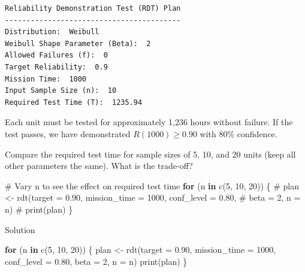 \documentclass[
  letterpaper,
  DIV=11,
  numbers=noendperiod]{scrreprt}
\newenvironment{Shaded}{\begin{snugshade}}{\end{snugshade}}
\newcommand{\AttributeTok}[1]{\textcolor[rgb]{0.40,0.45,0.13}{#1}}
\newcommand{\CommentTok}[1]{\textcolor[rgb]{0.37,0.37,0.37}{#1}}
\newcommand{\ControlFlowTok}[1]{\textcolor[rgb]{0.00,0.23,0.31}{\textbf{#1}}}
\newcommand{\DecValTok}[1]{\textcolor[rgb]{0.68,0.00,0.00}{#1}}
\newcommand{\FloatTok}[1]{\textcolor[rgb]{0.68,0.00,0.00}{#1}}
\newcommand{\FunctionTok}[1]{\textcolor[rgb]{0.28,0.35,0.67}{#1}}
\newcommand{\NormalTok}[1]{\textcolor[rgb]{0.00,0.23,0.31}{#1}}
\newcommand{\OtherTok}[1]{\textcolor[rgb]{0.00,0.23,0.31}{#1}}
\begin{document}
\begin{verbatim}
Reliability Demonstration Test (RDT) Plan
-----------------------------------------
Distribution:  Weibull 
Weibull Shape Parameter (Beta):  2 
Allowed Failures (f):  0 
Target Reliability:  0.9 
Mission Time:  1000 
Input Sample Size (n):  10 
Required Test Time (T):  1235.94 
\end{verbatim}

Each unit must be tested for approximately 1,236 hours without failure.
If the test passes, we have demonstrated \(R(1000) \geq 0.90\) with 80\%
confidence.

\begin{tcolorbox}[enhanced jigsaw, arc=.35mm, bottomrule=.15mm, bottomtitle=1mm, breakable, colback=white, colbacktitle=quarto-callout-note-color!10!white, colframe=quarto-callout-note-color-frame, coltitle=black, left=2mm, leftrule=.75mm, opacityback=0, opacitybacktitle=0.6, rightrule=.15mm, title=\textcolor{quarto-callout-note-color}{\faInfo}\hspace{0.5em}{Try It}, titlerule=0mm, toprule=.15mm, toptitle=1mm]

Compare the required test time for sample sizes of 5, 10, and 20 units
(keep all other parameters the same). What is the trade-off?

\begin{Shaded}
\begin{Highlighting}[]
\CommentTok{\# Vary n to see the effect on required test time}
\ControlFlowTok{for}\NormalTok{ (n }\ControlFlowTok{in} \FunctionTok{c}\NormalTok{(}\DecValTok{5}\NormalTok{, }\DecValTok{10}\NormalTok{, }\DecValTok{20}\NormalTok{)) \{}
  \CommentTok{\# plan \textless{}{-} rdt(target = 0.90, mission\_time = 1000, conf\_level = 0.80,}
  \CommentTok{\#             beta = 2, n = n)}
  \CommentTok{\# print(plan)}
\NormalTok{\}}
\end{Highlighting}
\end{Shaded}

Solution

\begin{Shaded}
\begin{Highlighting}[]
\ControlFlowTok{for}\NormalTok{ (n }\ControlFlowTok{in} \FunctionTok{c}\NormalTok{(}\DecValTok{5}\NormalTok{, }\DecValTok{10}\NormalTok{, }\DecValTok{20}\NormalTok{)) \{}
\NormalTok{  plan }\OtherTok{\textless{}{-}} \FunctionTok{rdt}\NormalTok{(}\AttributeTok{target =} \FloatTok{0.90}\NormalTok{, }\AttributeTok{mission\_time =} \DecValTok{1000}\NormalTok{, }\AttributeTok{conf\_level =} \FloatTok{0.80}\NormalTok{,}
              \AttributeTok{beta =} \DecValTok{2}\NormalTok{, }\AttributeTok{n =}\NormalTok{ n)}
  \FunctionTok{print}\NormalTok{(plan)}
\NormalTok{\}}
\end{Highlighting}
\end{Shaded}


\end{tcolorbox}
\end{document}
